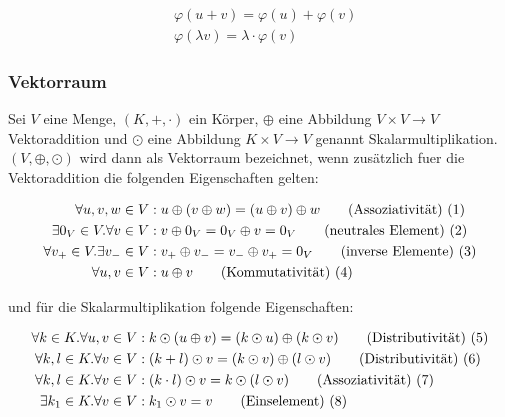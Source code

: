 \documentclass[a4paper,fontsize=12pt,toc=bib,halfparskip]{scrartcl}
\begin{document}
\begin{align}
	&\varphi(u+v) = \varphi(u) + \varphi(v) \\
	&\varphi(\lambda v) = \lambda \cdot \varphi(v)
\end{align}


\subsubsection{Vektorraum}
Sei $V$ eine Menge, $(K, +, \cdot )$ ein K\"orper, $\oplus$ eine Abbildung $V \times V \rightarrow V$  Vektoraddition und $\odot$ eine Abbildung $K \times V \rightarrow V$ genannt Skalarmultiplikation. $(V, \oplus, \odot)$ wird dann als Vektorraum bezeichnet, wenn zus\"atzlich fuer die Vektoraddition die folgenden Eigenschaften gelten: 

\begin{align}
	\forall u,v,w \in V&: u \oplus (v \oplus w ) = (u \oplus v ) \oplus w 	\tag{Assoziativit\"at) (\addtocounter{equation}{1}\theequation}\\
	\exists 0_V \in V. \forall v \in V&: v\oplus 0_V = 0_V \oplus v = 0_V 	\tag{neutrales Element) (\addtocounter{equation}{1}\theequation}\\
	\forall v_+ \in V. \exists v_- \in V&: v_+ \oplus v_- = v_- \oplus v_+ = 0_V	\tag{inverse Elemente) (\addtocounter{equation}{1}\theequation}\\
	\forall u, v \in V&: u \oplus v    \tag{Kommutativit\"at) (\addtocounter{equation}{1}\theequation}
\end{align}

und f\"ur die Skalarmultiplikation folgende Eigenschaften:

\begin{align}
	\forall k \in K. \forall u,v \in V&: k \odot (u \oplus v ) = (k \odot u ) \oplus( k \odot v) 	\tag{Distributivit\"at) (\addtocounter{equation}{1}\theequation}\\
	\forall k, l \in K. \forall v \in V&: ( k + l ) \odot v = (k \odot v ) \oplus( l \odot v) 	\tag{Distributivit\"at) (\addtocounter{equation}{1}\theequation}\\
	\forall k, l \in K. \forall v \in V&: (k \cdot l) \odot v = k \odot (l \odot v)	\tag{Assoziativit\"at) (\addtocounter{equation}{1}\theequation}\\
	\exists k_1 \in K. \forall v \in V&: k_1 \odot v = v	\tag{Einselement) (\addtocounter{equation}{1}\theequation}
\end{align}
\end{document}
